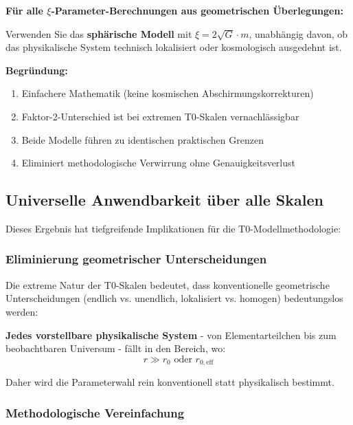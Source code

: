 \documentclass[12pt,a4paper]{article}
\begin{document}
\begin{tcolorbox}[colback=green!5!white,colframe=green!75!black,title=Praktische Empfehlung]
	\textbf{Für alle $\xi$-Parameter-Berechnungen aus geometrischen Überlegungen:}
	
	Verwenden Sie das \textbf{sphärische Modell} mit $\xi = 2\sqrt{G} \cdot m$, unabhängig davon, ob das physikalische System technisch lokalisiert oder kosmologisch ausgedehnt ist.
	
	\textbf{Begründung:}
	\begin{enumerate}
		\item Einfachere Mathematik (keine kosmischen Abschirmungskorrekturen)
		\item Faktor-2-Unterschied ist bei extremen T0-Skalen vernachlässigbar  
		\item Beide Modelle führen zu identischen praktischen Grenzen
		\item Eliminiert methodologische Verwirrung ohne Genauigkeitsverlust
	\end{enumerate}
\end{tcolorbox}

\subsection{Universelle Anwendbarkeit über alle Skalen}
\label{subsec:universal_applicability}

Dieses Ergebnis hat tiefgreifende Implikationen für die T0-Modellmethodologie:

\subsubsection{Eliminierung geometrischer Unterscheidungen}
\label{subsubsec:geometric_distinctions}

Die extreme Natur der T0-Skalen bedeutet, dass konventionelle geometrische Unterscheidungen (endlich vs. unendlich, lokalisiert vs. homogen) bedeutungslos werden:

\textbf{Jedes vorstellbare physikalische System} - von Elementarteilchen bis zum beobachtbaren Universum - fällt in den Bereich, wo:
\begin{equation}
	r \gg r_0 \text{ oder } r_{0,\text{eff}}
\end{equation}

Daher wird die Parameterwahl rein konventionell statt physikalisch bestimmt.

\subsubsection{Methodologische Vereinfachung}
\label{subsubsec:methodological_simplification}
\end{document}
